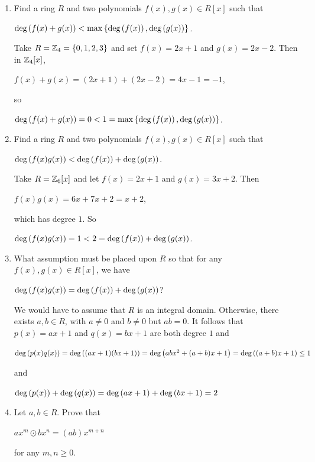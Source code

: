 \documentclass[11pt,fleqn,dvipsnames,usenames]{article}
\begin{document}
\begin{enumerate}[1.]
\item Find a ring $R$ and two polynomials $f(x),g(x)\in R[x]$ such that
\begin{center}
$\text{deg}\left(f(x) + g(x)\right) < \max\left\{\text{deg}\left(f(x)\right), \text{deg}\left(g(x)\right)\right\}$.
\end{center}
\vsmsp

\solution Take $R = \mathbb{Z}_{4} = \left\{0,1,2,3\right\}$ and set $f(x) = 2x + 1$ and $g(x) = 2x - 2$.  Then in $\mathbb{Z}_{4}[x]$,
\begin{center}
$f(x) + g(x) = (2x + 1) + (2x - 2) = 4x -1 = -1$,
\end{center}
so
\begin{center}
$\text{deg}\left(f(x) + g(x)\right) = 0 < 1 = \max\left\{\text{deg}\left(f(x)\right),\text{deg}\left(g(x)\right)\right\}$.
\end{center}

\item Find a ring $R$ and two polynomials $f(x),g(x)\in R[x]$ such that
\begin{center}
$\text{deg}\left(f(x)g(x)\right) < \text{deg}\left(f(x)\right) + \text{deg}\left(g(x)\right)$.
\end{center}
\vsmsp

\solution Take $R = \mathbb{Z}_{6}[x]$ and let $f(x) = 2x + 1$ and $g(x) = 3x + 2$.  Then
\begin{center}
$f(x)g(x) = 6x + 7x + 2 = x + 2$,
\end{center}
which has degree $1$.  So
\begin{center}
$\text{deg}\left(f(x)g(x)\right) = 1 < 2 = \text{deg}\left(f(x)\right) + \text{deg}\left(g(x)\right)$.
\end{center}

\item What assumption must be placed upon $R$ so that for any $f(x),g(x)\in R[x]$, we have
\begin{center}
$\text{deg}\left(f(x)g(x)\right) = \text{deg}\left(f(x)\right) + \text{deg}\left(g(x)\right)$?
\end{center}
\vsmsp

\solution We would have to assume that $R$ is an integral domain.  Otherwise, there exists $a,b\in R$, with $a\neq 0$ and $b\neq 0$ but $ab = 0$.  It follows that $p(x) = ax + 1$ and $q(x) = bx + 1$ are both degree $1$ and
\begin{center}
$\text{deg}\left(p(x)q(x)\right) = \text{deg}\left((ax+1)(bx+1)\right) = \text{deg}\left(abx^2 + (a+b)x + 1\right) = \text{deg}\left((a+b)x + 1\right) \leq 1$
\end{center}
and
\begin{center}
$\text{deg}\left(p(x)\right) + \text{deg}\left(q(x)\right) = \text{deg}\left(ax+1\right) + \text{deg}\left(bx+1\right) = 2$
\end{center}

\item Let $a,b\in R$.  Prove that
\begin{center}
$ax^{m}\odot bx^{n} = (ab)x^{m+n}$
\end{center}
for any $m,n\geq 0$.
\vsmsp


\end{enumerate}
\end{document}
